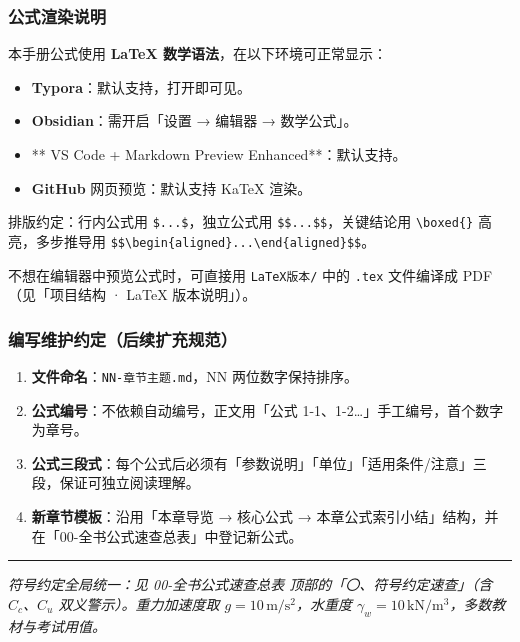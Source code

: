 \documentclass[
]{article}
\providecommand{\tightlist}{%
  \setlength{\itemsep}{0pt}\setlength{\parskip}{0pt}}
\begin{document}
\subsubsection{公式渲染说明}\label{ux516cux5f0fux6e32ux67d3ux8bf4ux660e}

本手册公式使用 \textbf{LaTeX 数学语法}，在以下环境可正常显示：

\begin{itemize}
\tightlist
\item
  \textbf{Typora}：默认支持，打开即可见。
\item
  \textbf{Obsidian}：需开启「设置 → 编辑器 → 数学公式」。
\item
  ** VS Code + Markdown Preview Enhanced**：默认支持。
\item
  \textbf{GitHub} 网页预览：默认支持 KaTeX 渲染。
\end{itemize}

排版约定：行内公式用 \texttt{\$...\$}，独立公式用
\texttt{\$\$...\$\$}，关键结论用 \texttt{\textbackslash{}boxed\{\}}
高亮，多步推导用
\texttt{\$\$\textbackslash{}begin\{aligned\}...\textbackslash{}end\{aligned\}\$\$}。

不想在编辑器中预览公式时，可直接用 \texttt{LaTeX版本/} 中的
\texttt{.tex} 文件编译成 PDF（见「项目结构 · LaTeX 版本说明」）。

\subsubsection{编写维护约定（后续扩充规范）}\label{ux7f16ux5199ux7ef4ux62a4ux7ea6ux5b9aux540eux7eedux6269ux5145ux89c4ux8303}

\begin{enumerate}
\def\labelenumi{\arabic{enumi}.}
\tightlist
\item
  \textbf{文件命名}：\texttt{NN-章节主题.md}，NN 两位数字保持排序。
\item
  \textbf{公式编号}：不依赖自动编号，正文用「公式
  1-1、1-2\ldots」手工编号，首个数字为章号。
\item
  \textbf{公式三段式}：每个公式后必须有「参数说明」「单位」「适用条件/注意」三段，保证可独立阅读理解。
\item
  \textbf{新章节模板}：沿用「本章导览 → 核心公式 →
  本章公式索引小结」结构，并在「00-全书公式速查总表」中登记新公式。
\end{enumerate}

\begin{center}\rule{0.5\linewidth}{0.5pt}\end{center}

\emph{符号约定全局统一：见 00-全书公式速查总表
顶部的「〇、符号约定速查」（含 \(C_c\)、\(C_u\) 双义警示）。重力加速度取
\(g=10\,\mathrm{m/s^2}\)，水重度
\(\gamma_w=10\,\mathrm{kN/m^3}\)，多数教材与考试用值。}
\end{document}
